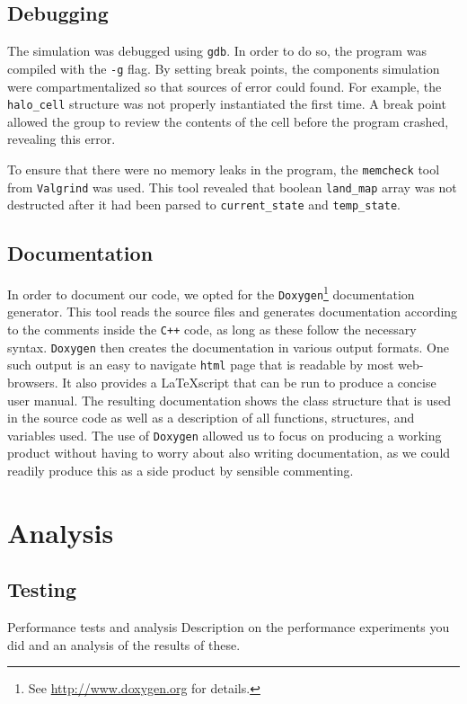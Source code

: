 \documentclass[a4paper,11pt]{article}
\begin{document}
\subsection{Debugging}

The simulation was debugged using \texttt{gdb}.  In order to do so, the program was compiled with the \texttt{-g} flag.  By setting break points, the components simulation were compartmentalized so that sources of error could found.  For example, the \texttt{halo\_cell} structure was not properly instantiated the first time.  A break point allowed the group to review the contents of the cell before the program crashed, revealing this error.   

To ensure that there were no memory leaks in the program, the \texttt{memcheck} tool from \texttt{Valgrind} was used.  This tool revealed that boolean \texttt{land\_map} array was not destructed after it had been parsed to \texttt{current\_state} and \texttt{temp\_state}.  
 
 \subsection{Documentation}

In order to document our code, we opted for the \texttt{Doxygen}\footnote{See \url{http://www.doxygen.org} for details.} documentation generator. This tool reads the source files and generates documentation according to the comments inside the \texttt{C++} code, as long as these follow the necessary syntax. \texttt{Doxygen} then creates the documentation in various output formats. One such output is an easy to navigate \texttt{html} page that is readable by most web-browsers. It also provides a \LaTeX  script that can be run to produce a concise user manual. The resulting documentation shows the class structure that is used in the source code as well as a description of all functions, structures, and variables used. The use of \texttt{Doxygen} allowed us to focus on producing a working product without having to worry about also writing documentation, as we could readily produce this as a side product by sensible commenting.   
 
 \section{Analysis}
 
 \subsection{Testing}
Performance tests and analysis Description on the performance experiments you did and an analysis
of the results of these.
\end{document}

